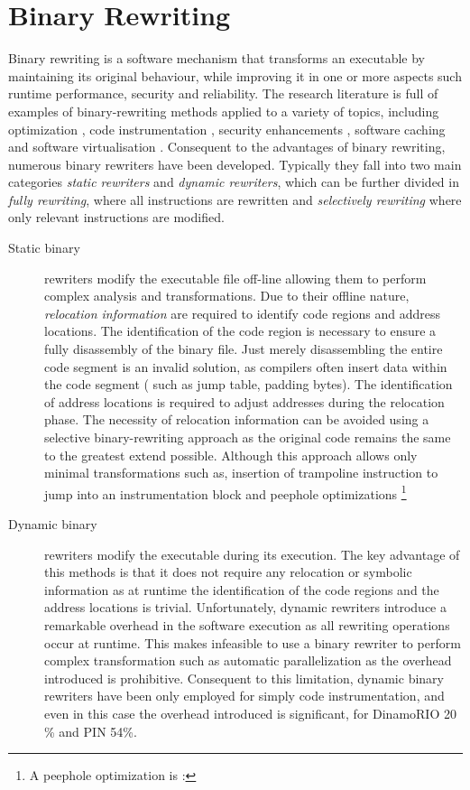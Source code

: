 \chapter{Binary Rewriting}
Binary rewriting is a software mechanism that transforms an executable by maintaining its original behaviour, while improving it in one or more aspects such runtime performance, security and reliability. The research literature is full of examples of binary-rewriting methods applied to a variety of topics, including optimization \cite{}, code instrumentation \cite{}, security enhancements \cite{vx32}, software caching and software virtualisation \cite{}. 
Consequent to the advantages of binary rewriting, numerous binary rewriters have been developed. Typically they fall into two main categories \emph{static rewriters} and \emph{dynamic rewriters}, which can be further divided in \emph{fully rewriting}, where all instructions are rewritten and \emph{selectively rewriting} where only relevant instructions are modified. 
\begin{description}

\item[Static binary] rewriters modify the executable file off-line allowing them to perform complex analysis and transformations. Due to their offline nature, \emph{relocation information} are required to identify code regions and address locations. The identification of the code region is necessary to ensure a fully disassembly of the binary file. Just merely disassembling  the entire code segment is an invalid solution, as  compilers often insert data within the code segment ( such as jump table, padding bytes). The identification of address locations is required to adjust addresses during the relocation phase. The necessity of relocation information can be avoided using a selective binary-rewriting approach \cite{seccomp-sandbox} as the original code remains the same to the greatest extend possible. Although this approach allows only minimal transformations such as, insertion of trampoline instruction to jump into an instrumentation block and peephole optimizations \footnote{A peephole optimization is : }

\item[Dynamic binary] rewriters modify the executable during its execution. The key advantage of this methods is that it does not require any relocation or symbolic information as at runtime the identification of the code regions and the address locations is trivial. Unfortunately, dynamic rewriters introduce a remarkable overhead in the software execution as all rewriting operations occur at runtime. This makes infeasible to use a binary rewriter to perform complex transformation such as automatic parallelization as the overhead introduced is prohibitive. Consequent to this limitation, dynamic binary rewriters have been only employed for simply code instrumentation, and even in this case the overhead introduced is significant, for DinamoRIO 20 \% and PIN 54\%.
\end{description}


